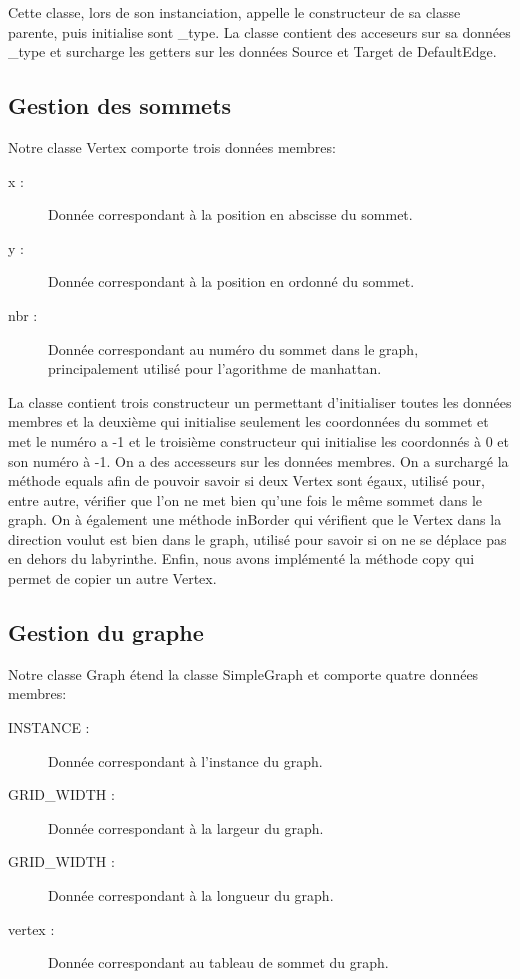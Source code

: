 \documentclass [10pt, a4paper]{article}
\begin{document}
Cette classe, lors de son instanciation, appelle le constructeur de sa classe parente, puis initialise sont _type.
La classe contient des acceseurs sur sa données _type et surcharge les getters sur les données Source et Target de DefaultEdge.

\subsection {Gestion des sommets}
Notre classe Vertex comporte trois données membres:
\begin {description}
\item  [x :]     Donnée correspondant à la position en abscisse du sommet.
\item  [y :]  Donnée correspondant à la position en ordonné du sommet.
\item  [nbr :] Donnée correspondant au numéro du sommet dans le graph, principalement utilisé pour l'agorithme de manhattan.
\end   {description}
La classe contient trois constructeur un permettant d'initialiser toutes les données membres et la deuxième qui initialise seulement les coordonnées du sommet et met le numéro a -1 et le troisième constructeur qui initialise les coordonnés à 0 et son numéro à -1. On a des accesseurs sur les données membres.
On a surchargé la méthode equals afin de pouvoir savoir si deux Vertex sont égaux, utilisé pour, entre autre, vérifier que l'on ne met bien qu'une fois le même sommet dans le graph. On à également une méthode inBorder qui vérifient que le Vertex dans la direction voulut est bien dans le graph, utilisé pour savoir si on ne se déplace pas en dehors du labyrinthe. Enfin, nous avons implémenté la méthode copy qui permet de copier un autre Vertex.

\subsection {Gestion du graphe}
Notre classe Graph étend la classe SimpleGraph et comporte quatre données membres:
\begin {description}
\item  [INSTANCE :]     Donnée correspondant à l'instance du graph.
\item  [GRID_WIDTH :]  Donnée correspondant à la largeur du graph.
\item  [GRID_WIDTH :] Donnée correspondant à la longueur du graph.
\item  [vertex :]  Donnée correspondant au tableau de sommet du graph.
\end   {description}
\end{document}
